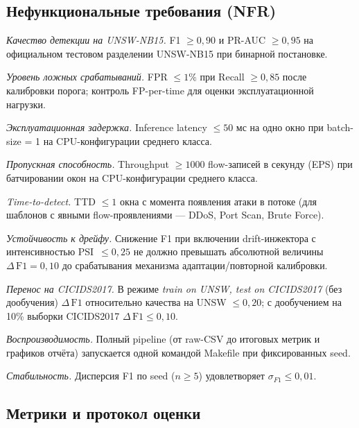 \subsection{Нефункциональные требования (\textbf{NFR})}

\begin{description}[font=\normalfont\bfseries, leftmargin=2.5em]
    \item[NFR-1.] \emph{Качество детекции на UNSW-NB15.}
    F1 \(\geq 0{,}90\) и PR-AUC \(\geq 0{,}95\) на официальном
    тестовом разделении UNSW-NB15 при бинарной постановке.
    \item[NFR-2.] \emph{Уровень ложных срабатываний.} FPR \(\leq 1\%\)
    при Recall \(\geq 0{,}85\) после калибровки порога; контроль
    FP-per-time для оценки эксплуатационной нагрузки.
    \item[NFR-3.] \emph{Эксплуатационная задержка.} Inference latency
    \(\leq 50\) мс на одно окно при batch-size = 1 на CPU-конфигурации
    среднего класса.
    \item[NFR-4.] \emph{Пропускная способность.} Throughput
    \(\geq 1000\) flow-записей в секунду (EPS) при батчировании
    окон на CPU-конфигурации среднего класса.
    \item[NFR-5.] \emph{Time-to-detect.} TTD \(\leq 1\) окна с момента
    появления атаки в потоке (для шаблонов с явными flow-проявлениями
    --- DDoS, Port Scan, Brute Force).
    \item[NFR-6.] \emph{Устойчивость к дрейфу.} Снижение F1 при включении
    drift-инжектора с интенсивностью PSI~\(\leq 0{,}25\) не должно
    превышать абсолютной величины \(\Delta\,\text{F1} = 0{,}10\) до
    срабатывания механизма адаптации/повторной калибровки.
    \item[NFR-7.] \emph{Перенос на CICIDS2017.} В режиме \emph{train on
    UNSW, test on CICIDS2017} (без дообучения) \(\Delta\,\text{F1}\)
    относительно качества на UNSW \(\leq 0{,}20\); с дообучением на 10\%
    выборки CICIDS2017 \(\Delta\,\text{F1} \leq 0{,}10\).
    \item[NFR-8.] \emph{Воспроизводимость.} Полный pipeline (от raw-CSV
    до итоговых метрик и графиков отчёта) запускается одной командой
    Makefile при фиксированных seed.
    \item[NFR-9.] \emph{Стабильность.} Дисперсия F1 по seed
    (\(n \geq 5\)) удовлетворяет \(\sigma_{F1} \leq 0{,}01\).
\end{description}

\subsection{Метрики и протокол оценки}


